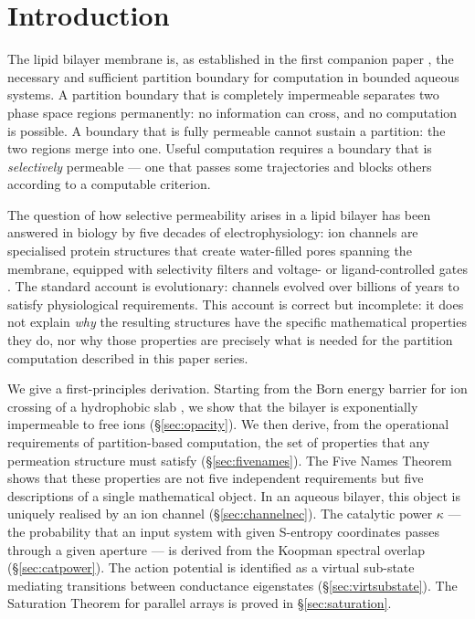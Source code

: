 \documentclass[11pt,twocolumn,a4paper]{article}
\theoremstyle{definition}
\theoremstyle{remark}
\newcommand{\kap}{\kappa}
\begin{document}
\section{Introduction}
\label{sec:introduction}

The lipid bilayer membrane is, as established in the first companion paper
\citep{companion1}, the necessary and sufficient partition boundary for
computation in bounded aqueous systems. A partition boundary that is completely
impermeable separates two phase space regions permanently: no information can
cross, and no computation is possible. A boundary that is fully permeable
cannot sustain a partition: the two regions merge into one. Useful computation
requires a boundary that is \emph{selectively} permeable --- one that passes
some trajectories and blocks others according to a computable criterion.

The question of how selective permeability arises in a lipid bilayer has been
answered in biology by five decades of electrophysiology: ion channels are
specialised protein structures that create water-filled pores spanning the
membrane, equipped with selectivity filters and voltage- or ligand-controlled
gates \citep{hille2001, neher1976, doyle1998}. The standard account is
evolutionary: channels evolved over billions of years to satisfy physiological
requirements. This account is correct but incomplete: it does not explain
\emph{why} the resulting structures have the specific mathematical properties
they do, nor why those properties are precisely what is needed for the partition
computation described in this paper series.

We give a first-principles derivation. Starting from the Born energy barrier
for ion crossing of a hydrophobic slab \citep{parsegian1969}, we show that
the bilayer is exponentially impermeable to free ions
(\S\ref{sec:opacity}). We then derive, from the operational requirements of
partition-based computation, the set of properties that any permeation structure
must satisfy (\S\ref{sec:fivenames}). The Five Names Theorem shows that these
properties are not five independent requirements but five descriptions of a
single mathematical object. In an aqueous bilayer, this object is uniquely
realised by an ion channel (\S\ref{sec:channelnec}). The catalytic power
$\kap$ --- the probability that an input system with given S-entropy coordinates
passes through a given aperture --- is derived from the Koopman spectral overlap
(\S\ref{sec:catpower}). The action potential is identified as a virtual sub-state
mediating transitions between conductance eigenstates (\S\ref{sec:virtsubstate}).
The Saturation Theorem for parallel arrays is proved in \S\ref{sec:saturation}.
\end{document}
